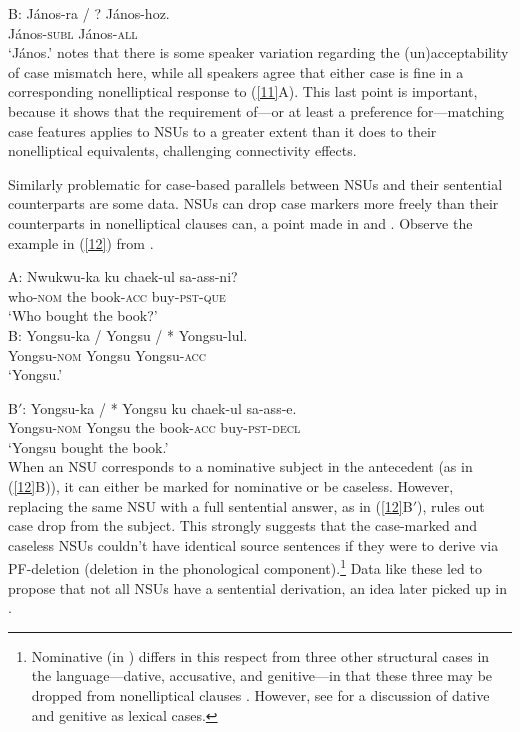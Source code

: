 B: \gll J\'{a}nos-ra / ? J\'{a}nos-hoz.\\
        J\'{a}nos-\textsc{subl} {} {} J\'{a}nos-\textsc{all}\\
\glt  `J\'{a}nos.'\label{11}
\z
%
\citet{Jacobson2016} notes that there is some speaker variation regarding the (un)ac\-cepta\-bi\-li\-ty of case mismatch here, while all speakers agree that either case is fine in a corresponding nonelliptical response to (\ref{11}A). This last point is important, because it shows that the requirement of---or at least a preference for---matching case features applies to NSUs to a greater extent than it does to their nonelliptical equivalents, challenging connectivity effects.

Similarly problematic for case-based parallels between NSUs and their sentential counterparts are some  data.  NSUs can drop case markers more freely than their counterparts in nonelliptical clauses can, a point made in \citet{Morgan1989} and \citet{Kim2015}. Observe the example in (\ref{12}) from \citet[237]{Morgan1989}.

  \ea
A: \gll Nwukwu-ka        ku  chaek-ul          sa-ass-ni?\\
        who-\textsc{nom} the book-\textsc{acc} buy-\textsc{pst}-\textsc{que}\\
\glt  `Who bought the book?'\\

B: \gll Yongsu-ka / Yongsu / * Yongsu-lul.\\
        Yongsu-\textsc{nom} {} Yongsu {} {} Yongsu-\textsc{acc}\\
\glt  `Yongsu.'

B$'$: \gll Yongsu-ka            /  *  Yongsu ku  chaek-ul          sa-ass-e.\\
           Yongsu-\textsc{nom}  {} {} Yongsu the book-\textsc{acc} buy-\textsc{pst}-\textsc{decl}\\
\glt  `Yongsu bought the book.'\\
\label{12}
\z
%
When an NSU  corresponds to a nominative subject in the antecedent (as in (\ref{12}B)), it can either be marked for nominative or be caseless.
However, replacing the same NSU  with a full sentential answer, as in (\ref{12}B$'$), rules out case drop from the subject. This strongly suggests that the case-marked and caseless NSUs couldn't have identical source sentences if they were to derive via PF-deletion (deletion in the phonological component).\footnote{Nominative (in ) differs in this respect from three other structural cases in the language---dative, accusative, and genitive---in that these three may be dropped from nonelliptical clauses \citep[see][]{Morgan1989, Lee2016, Kim2016}. However, see \citet{Mueller2002b} for a discussion of  dative and genitive as lexical cases.}  Data like these led \citet{Morgan1989} to propose that not all NSUs have a sentential derivation, an idea later picked up in \citet{Barton1998}.

